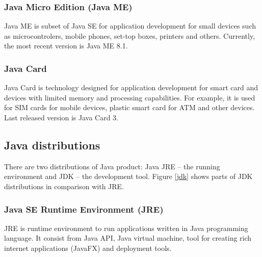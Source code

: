 \subsubsection{Java Micro Edition (Java ME)}
Java ME is subset of Java SE for application development for small devices such as microcontrolers, mobile phones, set-top boxes, printers and others. Currently, the most recent version is Java ME 8.1.

\subsubsection{Java Card}
Java Card is technology designed for application development for smart card and devices with limited memory and processing capabilities. For example, it is used for SIM cards for mobile devices, plastic smart card for ATM and other devices. Last released version is Java Card 3.

\subsection{Java distributions}
There are two distributions of Java product: Java JRE -- the running environment and JDK -- the development tool. Figure \ref{jdk} shows parts of JDK distributions in comparison with JRE.

\subsubsection{Java SE Runtime Environment (JRE)}
JRE is runtime environment to run applications written in Java programming language. It consist from Java API, Java virtual machine, tool for creating rich internet applications (JavaFX) and deployment tools.

